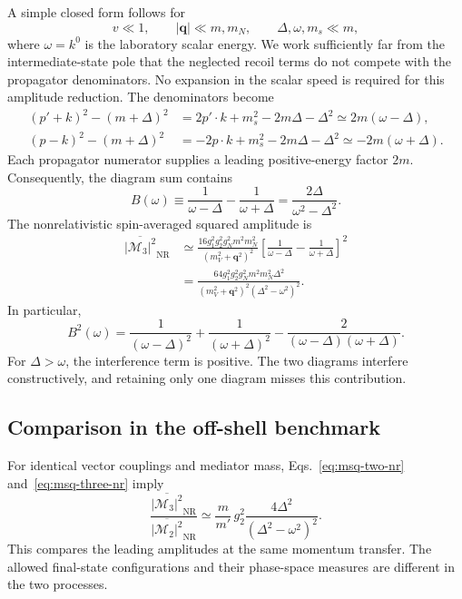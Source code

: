 \documentclass[prd,showpacs,preprintnumbers,amsmath,amssymb,twocolumn,
superscriptaddress,notitlepage]{revtex4-2}
\newcommand{\NR}{\mathrm{NR}}
\newcommand{\Msq}[1]{\overline{|\mathcal{M}_{#1}|^2}}
\newcommand{\qvec}{\boldsymbol{q}}
\begin{document}
A simple closed form follows for
\begin{equation}
v\ll1,\qquad |\qvec|\ll m,m_N,\qquad \Delta,\omega,m_s\ll m,
\end{equation}
where $\omega=k^0$ is the laboratory scalar energy. We work sufficiently
far from the intermediate-state pole that the neglected recoil terms
do not compete with the propagator denominators. No expansion in
the scalar speed is required for this amplitude reduction.
The denominators become
\begin{align}
(p'+k)^2-(m+\Delta)^2
&=2p'\cdot k+m_s^2-2m\Delta-\Delta^2
 \simeq2m(\omega-\Delta),\\
(p-k)^2-(m+\Delta)^2
&=-2p\cdot k+m_s^2-2m\Delta-\Delta^2
 \simeq-2m(\omega+\Delta).
\end{align}
Each propagator numerator supplies a leading positive-energy factor $2m$.
Consequently, the diagram sum contains
\begin{equation}
\boxed{
B(\omega)\equiv
\frac{1}{\omega-\Delta}-\frac{1}{\omega+\Delta}
=\frac{2\Delta}{\omega^2-\Delta^2}.
}
\label{eq:B}
\end{equation}
The nonrelativistic spin-averaged squared amplitude is
\begin{equation}
\boxed{\begin{aligned}
\Msq{3}_{\NR}
&\simeq
\frac{16g_1^2g_2^2g_N^2m^2m_N^2}{(m_V^2+\qvec^2)^2}
\left[
\frac{1}{\omega-\Delta}-\frac{1}{\omega+\Delta}
\right]^2\\[1mm]
&=
\frac{64g_1^2g_2^2g_N^2m^2m_N^2\Delta^2}
{(m_V^2+\qvec^2)^2(\Delta^2-\omega^2)^2}.
\end{aligned}}
\label{eq:msq-three-nr}
\end{equation}
In particular,
\begin{equation}
B^2(\omega)=
\frac{1}{(\omega-\Delta)^2}
+\frac{1}{(\omega+\Delta)^2}
-\frac{2}{(\omega-\Delta)(\omega+\Delta)}.
\label{eq:interference}
\end{equation}
For $\Delta>\omega$, the interference term is positive.
The two diagrams interfere constructively, and retaining only one
diagram misses this contribution.

\subsection{Comparison in the off-shell benchmark}

For identical vector couplings and mediator mass,
Eqs.~\eqref{eq:msq-two-nr} and~\eqref{eq:msq-three-nr} imply
\begin{equation}
\boxed{
\frac{\Msq{3}_{\NR}}{\Msq{2}_{\NR}}
\simeq
\frac{m}{m'}\,g_2^2
\frac{4\Delta^2}{(\Delta^2-\omega^2)^2}.
}
\label{eq:ratio}
\end{equation}
This compares the leading amplitudes at the same momentum transfer.
The allowed final-state configurations and their phase-space measures
are different in the two processes.
\end{document}
